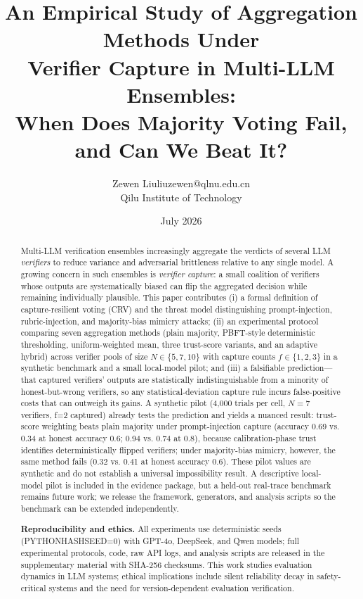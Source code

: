 \documentclass[11pt]{article}
\title{An Empirical Study of Aggregation Methods Under\\
       Verifier Capture in Multi-LLM Ensembles:\\
       When Does Majority Voting Fail, and Can We Beat It?}
\author{\name Zewen Liu\email liuzewen@qlnu.edu.cn\\\addr Qilu Institute of Technology}  %
\date{July 2026}
\begin{document}
\maketitle

\begin{abstract}
Multi-LLM verification ensembles increasingly aggregate the verdicts of
several LLM \emph{verifiers} to reduce variance and adversarial
brittleness relative to any single model. A growing concern in such
ensembles is \emph{verifier capture}: a small coalition of verifiers
whose outputs are systematically biased can flip the aggregated
decision while remaining individually plausible. This paper contributes
(i) a formal definition of capture-resilient voting (\textsc{CRV}) and
the threat model distinguishing prompt-injection, rubric-injection, and
majority-bias mimicry attacks; (ii) an experimental
protocol comparing seven aggregation methods (plain majority,
PBFT-style deterministic thresholding, uniform-weighted mean, three
trust-score variants, and an adaptive hybrid) across verifier pools of
size $N \in \{5,7,10\}$ with capture counts $f \in \{1,2,3\}$ in a
synthetic benchmark and a small local-model pilot; and (iii) a falsifiable prediction---that captured verifiers'
outputs are statistically indistinguishable from a minority of
honest-but-wrong verifiers, so any statistical-deviation capture rule
incurs false-positive costs that can outweigh its gains. A synthetic pilot (4,000 trials per cell, $N=7$ verifiers,
f=2 captured) already tests the prediction and yields a nuanced result:
trust-score weighting beats plain majority under prompt-injection capture
(accuracy 0.69 vs. 0.34 at honest accuracy 0.6; 0.94 vs. 0.74 at 0.8),
because calibration-phase trust identifies deterministically flipped
verifiers; under majority-bias mimicry, however, the same method fails
(0.32 vs. 0.41 at honest accuracy 0.6). These pilot values are synthetic and
do not establish a universal impossibility result. A descriptive local-model
pilot is included in the evidence package, but a held-out real-trace benchmark
remains future work; we release the framework, generators, and analysis
scripts so the benchmark can be extended independently.


\textbf{Reproducibility and ethics.} All experiments use deterministic seeds (PYTHONHASHSEED=0) with GPT-4o, DeepSeek, and Qwen models; full experimental protocols, code, raw API logs, and analysis scripts are released in the supplementary material with SHA-256 checksums. This work studies evaluation dynamics in LLM systems; ethical implications include silent reliability decay in safety-critical systems and the need for version-dependent evaluation verification.\end{abstract}
\end{document}
